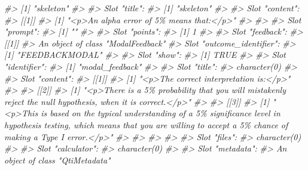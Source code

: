 \documentclass[twoside]{tufte-book}
\newenvironment{Shaded}{}{}
\newcommand{\CommentTok}[1]{\textcolor[rgb]{0.38,0.63,0.69}{\textit{#1}}}
\begin{document}
\begin{Shaded}
\begin{Highlighting}[]
\CommentTok{\#\textgreater{} [1] "skeleton"}
\CommentTok{\#\textgreater{} }
\CommentTok{\#\textgreater{} Slot "title":}
\CommentTok{\#\textgreater{} [1] "skeleton"}
\CommentTok{\#\textgreater{} }
\CommentTok{\#\textgreater{} Slot "content":}
\CommentTok{\#\textgreater{} [[1]]}
\CommentTok{\#\textgreater{} [1] "\textless{}p\textgreater{}An alpha error of 5\% means that:\textless{}/p\textgreater{}"}
\CommentTok{\#\textgreater{} }
\CommentTok{\#\textgreater{} }
\CommentTok{\#\textgreater{} Slot "prompt":}
\CommentTok{\#\textgreater{} [1] ""}
\CommentTok{\#\textgreater{} }
\CommentTok{\#\textgreater{} Slot "points":}
\CommentTok{\#\textgreater{} [1] 1}
\CommentTok{\#\textgreater{} }
\CommentTok{\#\textgreater{} Slot "feedback":}
\CommentTok{\#\textgreater{} [[1]]}
\CommentTok{\#\textgreater{} An object of class "ModalFeedback"}
\CommentTok{\#\textgreater{} Slot "outcome\_identifier":}
\CommentTok{\#\textgreater{} [1] "FEEDBACKMODAL"}
\CommentTok{\#\textgreater{} }
\CommentTok{\#\textgreater{} Slot "show":}
\CommentTok{\#\textgreater{} [1] TRUE}
\CommentTok{\#\textgreater{} }
\CommentTok{\#\textgreater{} Slot "identifier":}
\CommentTok{\#\textgreater{} [1] "modal\_feedback"}
\CommentTok{\#\textgreater{} }
\CommentTok{\#\textgreater{} Slot "title":}
\CommentTok{\#\textgreater{} character(0)}
\CommentTok{\#\textgreater{} }
\CommentTok{\#\textgreater{} Slot "content":}
\CommentTok{\#\textgreater{} [[1]]}
\CommentTok{\#\textgreater{} [1] "\textless{}p\textgreater{}The correct interpretation is:\textless{}/p\textgreater{}"}
\CommentTok{\#\textgreater{} }
\CommentTok{\#\textgreater{} [[2]]}
\CommentTok{\#\textgreater{} [1] "\textless{}p\textgreater{}There is a 5\% probability that you will mistakenly reject the null hypothesis, when it is correct.\textless{}/p\textgreater{}"}
\CommentTok{\#\textgreater{} }
\CommentTok{\#\textgreater{} [[3]]}
\CommentTok{\#\textgreater{} [1] "\textless{}p\textgreater{}This is based on the typical understanding of a 5\% significance level in hypothesis testing, which means that you are willing to accept a 5\% chance of making a Type I error.\textless{}/p\textgreater{}"}
\CommentTok{\#\textgreater{} }
\CommentTok{\#\textgreater{} }
\CommentTok{\#\textgreater{} }
\CommentTok{\#\textgreater{} }
\CommentTok{\#\textgreater{} Slot "files":}
\CommentTok{\#\textgreater{} character(0)}
\CommentTok{\#\textgreater{} }
\CommentTok{\#\textgreater{} Slot "calculator":}
\CommentTok{\#\textgreater{} character(0)}
\CommentTok{\#\textgreater{} }
\CommentTok{\#\textgreater{} Slot "metadata":}
\CommentTok{\#\textgreater{} An object of class "QtiMetadata"}

\end{Highlighting}
\end{Shaded}
\end{document}

